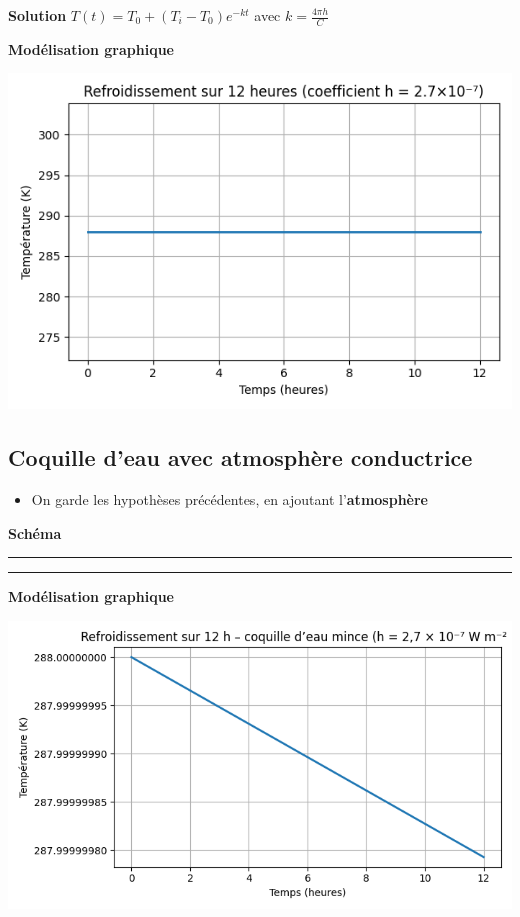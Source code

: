 \documentclass[a4paper,12pt]{article}
\begin{document}
\vspace{0.5cm}

\textbf{Solution} 
$T(t) = T_0 + (T_i - T_0)e^{-kt}$ \quad avec $k = \frac{4\pi h}{C}$
\\
\bigskip

\textbf{Modélisation graphique}
\begin{center}
  \includegraphics[width=0.8\linewidth]{../modele2/figures/modele2.png}
\end{center}
    
\vspace{1cm}
\subsection{Coquille d’eau avec atmosphère conductrice }
\begin{itemize}
    \item On garde les hypothèses précédentes, en ajoutant l'\textbf{atmosphère} \end{itemize}
\vspace{1cm}
\textbf{Schéma}
\\
\noindent\textcolor{gray}{\rule{\linewidth}{0.4pt}}

    
\begin{center}
  
\end{center}
\noindent\textcolor{gray}{\rule{\linewidth}{0.4pt}}
\vspace{0.5cm}
\textbf{Modélisation graphique}
\begin{center}
  \includegraphics[width=0.8\linewidth]{../modele2/figures/modele2_coquille.png}
\end{center}
        
\end{document}
